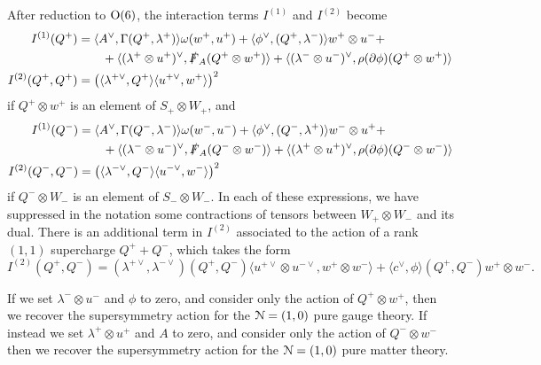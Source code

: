 \documentclass[10pt, oneside]{article}
\begin{document}
\begin{prop} \label{O6_decomposition_of_susy_prop}
After reduction to $\mathrm{O}(6)$, the interaction terms $I^{(1)}$ and $I^{(2)}$ become
\begin{align*}
I^{(1)}(Q^+) &= \langle A^\vee, \Gamma(Q^+, \lambda^+)\rangle\omega(w^+,u^+) + \langle \phi^\vee, (Q^+,\lambda^-)\rangle w^+ \otimes u^- + \\&\qquad + \langle (\lambda^{+} \otimes u^+)^\vee, \slashed{F}_A (Q^+ \otimes w^+) \rangle + \langle (\lambda^{-} \otimes u^-)^\vee, \rho(\partial \phi)(Q^+ \otimes w^+) \rangle\\
I^{(2)}(Q^+, Q^+) &= \left(\langle\lambda^{+\vee},Q^+\rangle\langle u^{+\vee}, w^+ \rangle\right)^2
\end{align*}
if $Q^+ \otimes w^+$ is an element of $S_+ \otimes W_+$, and
\begin{align*}
I^{(1)}(Q^-) &= \langle A^\vee, \Gamma(Q^-, \lambda^-)\rangle\omega(w^-,u^-) + \langle \phi^\vee, (Q^-,\lambda^+)\rangle w^- \otimes u^+ + \\&\qquad + \langle (\lambda^{-} \otimes u^-)^\vee, \slashed{F}_A (Q^- \otimes w^-) \rangle + \langle (\lambda^{+} \otimes u^+)^\vee, \rho(\partial \phi)(Q^- \otimes w^-) \rangle\\
I^{(2)}(Q^-, Q^-) &= \left(\langle\lambda^{-\vee},Q^-\rangle\langle u^{-\vee}, w^- \rangle\right)^2
\end{align*}
if $Q^- \otimes W_-$ is an element of $S_- \otimes W_-$.  In each of these expressions, we have suppressed in the notation some contractions of tensors between $W_+ \otimes W_-$ and its dual.  There is an additional term in $I^{(2)}$ associated to the action of a rank $(1,1)$ supercharge $Q^+ + Q^-$, which takes the form
\[I^{(2)}(Q^+, Q^-) = (\lambda^{+\vee}, \lambda^{-\vee})(Q^+,Q^-) \langle u^{+\vee} \otimes u^{-\vee}, w^+ \otimes w^-\rangle + \langle c^\vee, \phi \rangle(Q^+,Q^-) w^+ \otimes w^-. \]
\end{prop}

\begin{remark}
If we set $\lambda^- \otimes u^-$ and $\phi$ to zero, and consider only the action of $Q^+ \otimes w^+$, then we recover the supersymmetry action for the $\mathcal{N}=(1,0)$ pure gauge theory.  If instead we set $\lambda^+ \otimes u^+$ and $A$ to zero, and consider only the action of $Q^- \otimes w^-$ then we recover the supersymmetry action for the $\mathcal{N}=(1,0)$ pure matter theory.
\end{remark}
\end{document}
